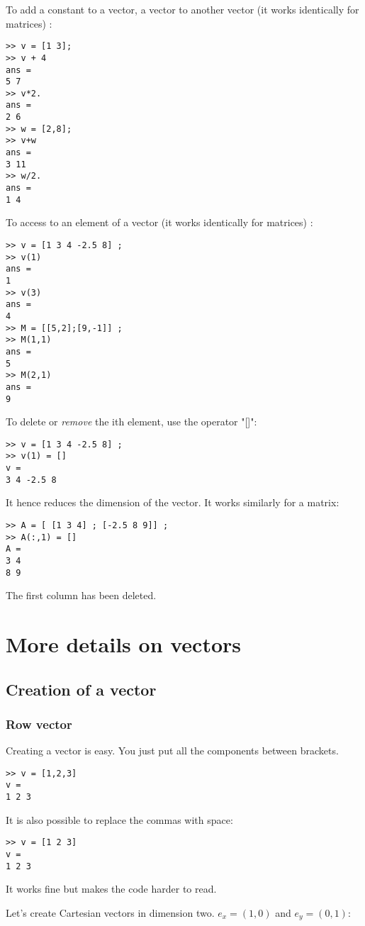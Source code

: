 To add a constant to a vector, a vector to another vector (it works identically for matrices) :
\begin{lstlisting}
>> v = [1 3];
>> v + 4
ans =
5 7
>> v*2.
ans =
2 6
>> w = [2,8];
>> v+w
ans =
3 11
>> w/2.
ans =
1 4
\end{lstlisting}

To access to an element of a vector  (it works identically for matrices) :

\begin{lstlisting}
>> v = [1 3 4 -2.5 8] ;
>> v(1)
ans = 
1
>> v(3)
ans = 
4
>> M = [[5,2];[9,-1]] ;
>> M(1,1)
ans =
5
>> M(2,1)
ans =
9
\end{lstlisting}

To delete or \emph{remove} the ith element, use the operator "[]":

\begin{lstlisting}
>> v = [1 3 4 -2.5 8] ;
>> v(1) = []
v = 
3 4 -2.5 8
\end{lstlisting}
It hence reduces the dimension of the vector. It works similarly for a matrix:
\begin{lstlisting}
>> A = [ [1 3 4] ; [-2.5 8 9]] ;
>> A(:,1) = []
A = 
3 4
8 9
\end{lstlisting}
The first column has been deleted.




\section{More details on vectors}
\subsection{Creation of a vector}
\subsubsection{Row vector}
Creating a vector  is easy. You just put all the components between brackets.
\begin{lstlisting}
>> v = [1,2,3]
v =
1 2 3
\end{lstlisting}
It is also possible to replace the commas with space:
\begin{lstlisting}
>> v = [1 2 3]
v =
1 2 3
\end{lstlisting}

It works fine but makes the code harder to read.

Let's create Cartesian vectors in dimension two. $e_x = (1,0)$ and $e_y = (0,1)$:


